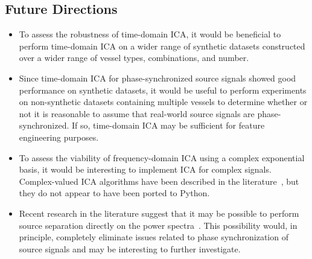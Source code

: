 \documentclass[10pt]{article}
\begin{document}
\subsection*{Future Directions}
\begin{itemize}
    \item To assess the robustness of time-domain ICA, it would be beneficial to perform
        time-domain ICA on a wider range of synthetic datasets constructed over a wider
        range of vessel types, combinations, and number.

    \item Since time-domain ICA for phase-synchronized source signals showed good
        performance on synthetic datasets, it would be useful to perform experiments
        on non-synthetic datasets containing multiple vessels to determine whether or not
        it is reasonable to assume that real-world source signals are phase-synchronized.
        If so, time-domain ICA may be sufficient for feature engineering purposes.

    \item To assess the viability of frequency-domain ICA using a complex exponential
        basis, it would be interesting to implement ICA for complex signals. Complex-valued
        ICA algorithms have been described in the
        literature~\cite{novey:2006,novey:2007,novey:2008,novey:2008b}, but they do not
        appear to have been ported to Python.

    \item Recent research in the literature suggest that it may be possible to perform
        source separation directly on the power spectra~\cite{fu:2016}. This possibility
        would, in principle, completely eliminate issues related to phase synchronization
        of source signals and may be interesting to further investigate.
\end{itemize}

\printbibliography
\end{document}
